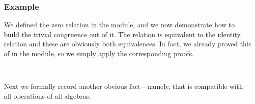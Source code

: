 \subsubsection{Example}\label{cong-example}
We defined the zero relation  in the  module, and we now demonstrate how to build the trivial congruence out of it.  The relation  is equivalent to the identity relation  and these are obviously both equivalences. In fact, we already proved this of  in the  module, so we simply apply the corresponding proofs.
\ccpad
\begin{code}%
\>[0]\AgdaSpace{}%
\AgdaSymbol{:}\AgdaSpace{}%
\AgdaSymbol{\{}\AgdaSpace{}%
\AgdaSymbol{:}\AgdaSpace{}%
\AgdaSpace{}%
\AgdaSymbol{\}}\AgdaSpace{}%
%
\>[31]\AgdaSpace{}%
\AgdaSymbol{\{}\AgdaSpace{}%
\AgdaSymbol{=}\AgdaSpace{}%
\AgdaSymbol{\}}\AgdaSpace{}%
\<%
\\
\>[0]\AgdaSpace{}%
\AgdaSymbol{=}\AgdaSpace{}%
\AgdaSpace{}%
\AgdaSymbol{\{}\AgdaSpace{}%
\AgdaSymbol{=}\AgdaSpace{}%
\AgdaSpace{}%
\AgdaSpace{}%
\AgdaSpace{}%
\AgdaSymbol{\{}\AgdaSpace{}%
\AgdaSymbol{=}\AgdaSpace{}%
\AgdaSymbol{\};}\AgdaSpace{}%
\AgdaSpace{}%
\AgdaSymbol{=}\AgdaSpace{}%
\AgdaSymbol{;}\AgdaSpace{}%
\AgdaSpace{}%
\AgdaSymbol{=}\AgdaSpace{}%
\AgdaSymbol{\}}\<%
\end{code}
\ccpad
Next we formally record another obvious fact---namely, that  is compatible with all operations of all algebras.
\ccpad
